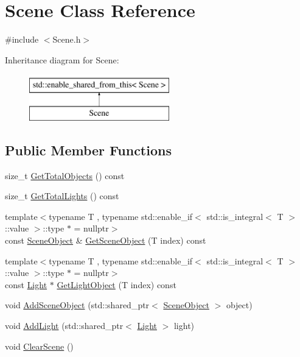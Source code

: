 \hypertarget{class_scene}{}\section{Scene Class Reference}
\label{class_scene}


{\ttfamily \#include $<$Scene.\+h$>$}

Inheritance diagram for Scene\+:\begin{figure}[H]
\begin{center}
\leavevmode
\includegraphics[height=2.000000cm]{class_scene}
\end{center}
\end{figure}
\subsection*{Public Member Functions}
\begin{DoxyCompactItemize}
\item 
size\+\_\+t \hyperlink{class_scene_a23da430906feb967d70195ef26ba7a88}{Get\+Total\+Objects} () const 
\item 
size\+\_\+t \hyperlink{class_scene_ab9d522852e85884def3d10600106d724}{Get\+Total\+Lights} () const 
\item 
{\footnotesize template$<$typename T , typename std\+::enable\+\_\+if$<$ std\+::is\+\_\+integral$<$ T $>$\+::value $>$\+::type $\ast$  = nullptr$>$ }\\const \hyperlink{class_scene_object}{Scene\+Object} \& \hyperlink{class_scene_acfd7dbaefb2feb8233d2a07d497542d7}{Get\+Scene\+Object} (T index) const 
\item 
{\footnotesize template$<$typename T , typename std\+::enable\+\_\+if$<$ std\+::is\+\_\+integral$<$ T $>$\+::value $>$\+::type $\ast$  = nullptr$>$ }\\const \hyperlink{class_light}{Light} $\ast$ \hyperlink{class_scene_abb610e4c698b3c2ebfb922b5352eba36}{Get\+Light\+Object} (T index) const 
\item 
void \hyperlink{class_scene_a6e51f14c74c252d231b73d7109b8117e}{Add\+Scene\+Object} (std\+::shared\+\_\+ptr$<$ \hyperlink{class_scene_object}{Scene\+Object} $>$ object)
\item 
void \hyperlink{class_scene_ab9b1a906b16bf867600fc3f5b734c1d4}{Add\+Light} (std\+::shared\+\_\+ptr$<$ \hyperlink{class_light}{Light} $>$ light)
\item 
void \hyperlink{class_scene_ac3b0f6126be07f78a61abfac3487e4df}{Clear\+Scene} ()
\end{DoxyCompactItemize}
